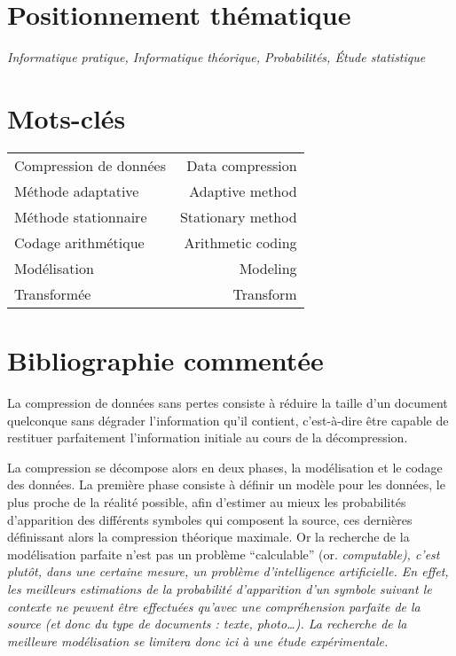 \documentclass[a4paper, 11pt]{article}
\begin{document}


\section*{Positionnement thématique}

\hspace{1cm} {\itshape
Informatique pratique, Informatique théorique, Probabilités, \'Etude statistique
}

\section*{Mots-clés}

\hspace{1cm} {\large \begin{tabular}{|lr|}
Compression de données & Data compression \\
Méthode adaptative & Adaptive method \\
Méthode stationnaire & Stationary method \\
Codage arithmétique & Arithmetic coding \\
Modélisation & Modeling \\
Transformée & Transform \\
\end{tabular}}

\section*{Bibliographie commentée}

La compression de données sans pertes consiste à réduire la taille d'un document quelconque sans dégrader l'information qu'il contient, c'est-à-dire être capable de restituer parfaitement l'information initiale au cours de la décompression.

\vspace{0.2cm}

La compression se décompose alors en deux phases, la modélisation et le codage des données. La première phase consiste à définir un modèle pour les données, le plus proche de la réalité possible, afin d'estimer au mieux les probabilités d'apparition des différents symboles qui composent la source, ces dernières définissant alors la compression théorique maximale. Or la recherche de la modélisation parfaite n'est pas un problème ``calculable'' (or. \it{computable}), c'est plutôt, dans une certaine mesure, un problème d'intelligence artificielle. En effet, les meilleurs estimations de la probabilité d'apparition d'un symbole suivant le contexte ne peuvent être effectuées qu'avec une compréhension parfaite de la source (et donc du type de documents : texte, photo\ldots{}). La recherche de la meilleure modélisation se limitera donc ici à une étude expérimentale.
\end{document}
